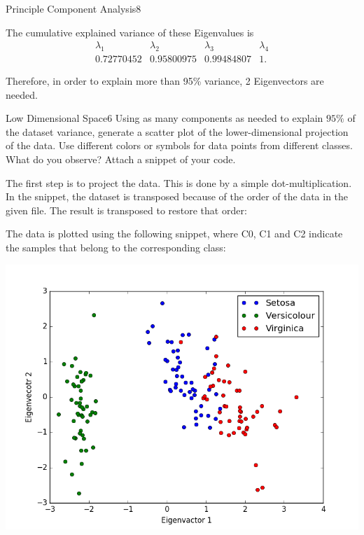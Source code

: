 \begin{questions}
\begin{question}{Principle Component Analysis}{8}
\begin{answer}




The cumulative explained variance of these Eigenvalues is 
\[
\begin{array}{c|c|c|c}
\lambda_1& \lambda_2 & \lambda_3 & \lambda_4 \\ \hline
0.72770452 & 0.95800975 & 0.99484807 & 1.
\end{array} 
\]

Therefore, in order to explain more than 95\% variance, 2 Eigenvectors are needed.
	
\end{answer}

\end{question}


\begin{question}{Low Dimensional Space}{6}
Using as many components as needed to explain $95\%$ of the dataset variance, generate a scatter plot of the lower-dimensional projection of the data. Use different colors or symbols for data points from different classes. 
What do you observe? Attach a snippet of your code.

\begin{answer}
The first step is to project the data. This is done by a simple dot-multiplication. In the snippet, the dataset is transposed because of the order of the data in the given file. The result is transposed to restore that order:



The data is plotted using the following snippet, where C0, C1 and C2 indicate the samples that belong to the corresponding class:


\includegraphics[width=1.0\linewidth]{./img/33c.png}


\end{answer}
\end{question}
\end{questions}
